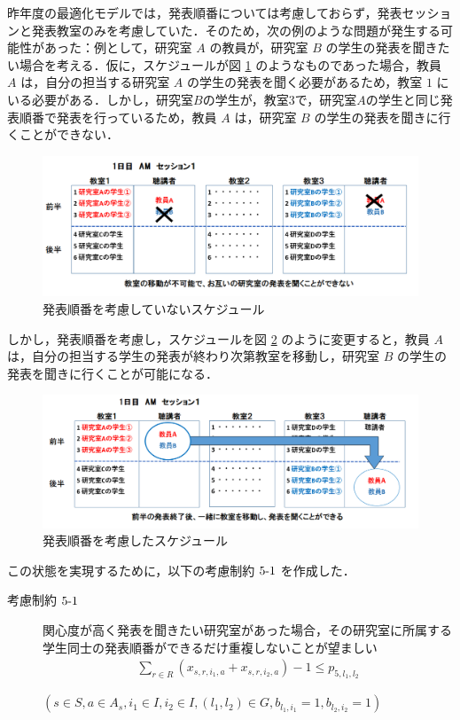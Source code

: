 \documentclass[a4paper,12pt,fleqn]{jarticle}
\begin{document}
昨年度の最適化モデルでは，発表順番については考慮しておらず，発表セッションと発表教室のみを考慮していた．そのため，次の例のような問題が発生する可能性があった：例として，研究室 $A$ の教員が，研究室 $B$ の学生の発表を聞きたい場合を考える．仮に，スケジュールが図 \ref{fig:Before} のようなものであった場合，教員 $A$ は，自分の担当する研究室 $A$ の学生の発表を聞く必要があるため，教室 $1$ にいる必要がある．しかし，研究室$B$の学生が，教室$3$で，研究室$A$の学生と同じ発表順番で発表を行っているため，教員 $A$ は，研究室 $B$ の学生の発表を聞きに行くことができない．
\begin{figure}[H]
  \begin{center}
    \includegraphics[scale=0.65]{BeforeOrder.png}
    \caption{発表順番を考慮していないスケジュール}
    \label{fig:Before}
  \end{center}
\end{figure}
しかし，発表順番を考慮し，スケジュールを図 \ref{fig:after} のように変更すると，教員 $A$ は，自分の担当する学生の発表が終わり次第教室を移動し，研究室 $B$ の学生の発表を聞きに行くことが可能になる．
\begin{figure}[H]
  \begin{center}
    \includegraphics[scale=0.65]{AfterOrder.png}
    \caption{発表順番を考慮したスケジュール}
    \label{fig:after}
  \end{center}
\end{figure}
この状態を実現するために，以下の考慮制約 $5\mathchar`-1$ を作成した．
 \begin{description}
\item[考慮制約 $5\mathchar`-1$] 関心度が高く発表を聞きたい研究室があった場合，その研究室に所属する学生同士の発表順番ができるだけ重複しないことが望ましい
  \begin{eqnarray}
   \sum_{r \in R} (x_{s,r,i_1,a} + x_{s,r,i_2,a}) - 1 \leq p_{5,l_1,l_2} \label{eq:p5}
  \end{eqnarray}
  \begin{center}
  $(s \in S,a \in A_s,i_1 \in I,i_2 \in I,(l_1,l_2) \in G,b_{l_1,i_1} = 1,b_{l_2,i_2} = 1)$
  \end{center}
  \end{description}
  
\end{document}

